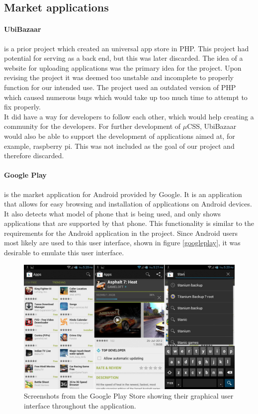 \subsection{Market applications}
\paragraph{UbiBazaar} is a prior project which created an universal app store in PHP. This project had potential for serving as a back end, but this was later discarded. The idea of a website for uploading applications was the primary idea for the project. Upon revising the project it was deemed too unstable and incomplete to properly function for our intended use. The project used an outdated version of PHP which caused numerous bugs which would take up too much time to attempt to fix properly.\\

It did have a way for developers to follow each other, which would help creating a community for the developers. For further development of $\mu$CSS, UbiBazaar would also be able to support the development of applications aimed at, for example, raspberry pi. This was not included as the goal of our project and therefore discarded.

\paragraph{Google Play} is the market application for Android provided by Google. It is an application that allows for easy browsing and installation of applications on Android devices. It also detects what model of phone that is being used, and only shows applications that are supported by that phone. This functionality is similar to the requirements for the Android application in the project. Since Android users most likely are used to this user interface, shown in figure \ref{googleplay}, it was desirable to emulate this user interface.\\

\begin{figure}[H]
\centering
\includegraphics[scale=0.2]{images/Google-Play-Store-APK-3-7-15.jpg}
\caption[Google Play]{Screenshots from the Google Play Store showing their graphical user interface throughout the application.}
\label{fig:googleplay}
\end{figure}

